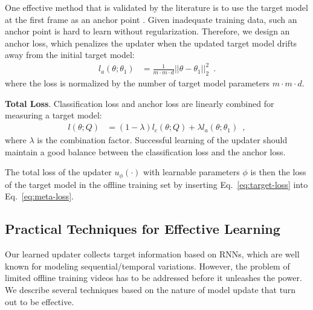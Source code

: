 \documentclass[journal]{IEEEtran}
\begin{document}
One effective method that is validated by the literature is to use the target model at the first frame as an anchor point \cite{matthews2004template, guo2017learning}. Given inadequate training data, such an anchor point is hard to learn without regularization. Therefore, we design an anchor loss, which penalizes the updater when the updated target model drifts away from the initial target model:
\begin{equation}
	\begin{aligned}
		l_a(\theta; \theta_1) &= \frac{1}{m\cdot m \cdot d}||\theta - \theta_1||_2^2 \enspace .
	\end{aligned}
\end{equation}
where the loss is normalized by the number of target model parameters $m\cdot m \cdot d$.

\textbf{Total Loss}. Classification loss and anchor loss are linearly combined for measuring a target model: 
\begin{equation}
	\begin{aligned} \label{eq:target-loss}
		l(\theta; Q) &= (1 - \lambda) l_c(\theta; Q) + \lambda l_a(\theta; \theta_1) \enspace ,
	\end{aligned}
\end{equation}
where $\lambda$ is the combination factor. Successful learning of the updater should maintain a good balance between the classification loss and the anchor loss.

The total loss of the updater $u_{\phi}(\cdot)$ with learnable parameters $\phi$ is then the loss of the target model in the offline training set by inserting Eq.~\ref{eq:target-loss} into Eq.~\ref{eq:meta-loss}.

\subsection{Practical Techniques for Effective Learning}\label{sec:effective-techniques}
Our learned updater collects target information based on RNNs, which are well known for modeling sequential/temporal variations. However, the problem of limited offline training videos has to be addressed before it unleashes the power. We describe several techniques based on the nature of model update that turn out to be effective.
\end{document}
